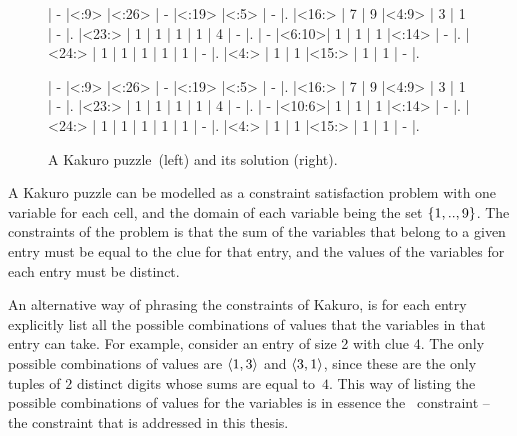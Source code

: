 \documentclass[a4paper,11pt]{article}
\newcommand{\Table}{\Constraint{Table}}
\numberwithin{equation}{section}
\begin{document}
\begin{figure}
  \centering
  \begin{minipage}{.45\textwidth}
    \begin{Kakuro}{6}{6}
      |  -   |<:9>  |<:26> |  -   |<:19> |<:5>  |  -   |.
      |<16:> |  7   |  9   |<4:9> |  3   |  1   |  -   |.
      |<23:> |  1   |  1   |  1   |  1   |  4   |  -   |.
      |  -   |<6:10>|  1   |  1   |  1   |<:14> |  -   |.
      |<24:> |  1   |  1   |  1   |  1   |  1   |  -   |.
      |<4:>  |  1   |  1   |<15:> |  1   |  1   |  -   |.
    \end{Kakuro}
  \end{minipage}
  \begin{minipage}{.45\textwidth}
    \PuzzleSolution
    \begin{Kakuro}{6}{6}
      |  -   |<:9>  |<:26> |  -   |<:19> |<:5>  |  -   |.
      |<16:> |  7   |  9   |<4:9> |  3   |  1   |  -   |.
      |<23:> |  1   |  1   |  1   |  1   |  4   |  -   |.
      |  -   |<10:6>|  1   |  1   |  1   |<:14> |  -   |.
      |<24:> |  1   |  1   |  1   |  1   |  1   |  -   |.
      |<4:>  |  1   |  1   |<15:> |  1   |  1   |  -   |.
    \end{Kakuro}
  \end{minipage}
  \caption{A Kakuro puzzle~\protect\footnotemark (left) and its solution (right).}
  \label{fig:kakuro}
\end{figure}


A Kakuro puzzle can be modelled as a constraint satisfaction problem with one variable
for each cell, and the domain of each variable being the set $\left\{1,..,9\right\}$.
The constraints of the problem is that the sum of the variables that
belong to a given entry must be equal to the clue for that entry, and the
values of the variables for each entry must be distinct.

An alternative way of phrasing the constraints of Kakuro, is for each entry
explicitly list all the possible combinations
of values that the variables in that entry can take.
For example, consider an entry of size 2 with clue 4. The only
possible combinations of values are $\left\langle1,3\right\rangle$ and $\left\langle3,1\right\rangle$, since
these are the only tuples of $2$ distinct digits whose sums are 
equal to~$4$. This way of listing the possible combinations of 
values for the variables is in essence the 
\Table~constraint -- the constraint that is
addressed in this thesis.
\end{document}
